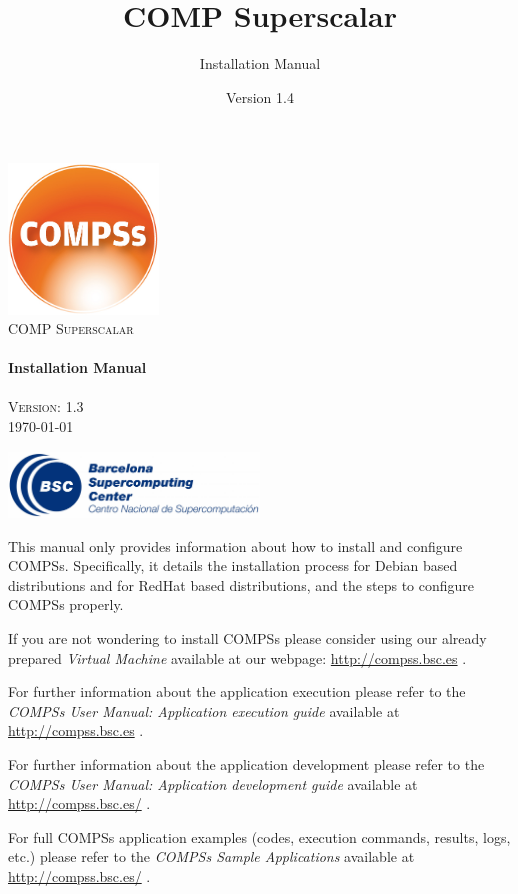 \documentclass[a4paper,12pt]{article}
\title{COMP Superscalar}
\author{Installation Manual}
\date{Version 1.4}
\begin{document}
  \hypersetup{pageanchor=false}
  \begin{titlepage} 
    \begin{center} 
      \includegraphics[width=0.3\textwidth]{./Figures/Logos/degradado-naranja-compss.jpg}~\\[1cm] 
      \textsc{\LARGE COMP Superscalar}\\[1.5cm] 
      
      \HRule \\[0.4cm] 
      { \huge \bfseries Installation Manual \\[0.4cm] }
      \HRule \\[1.5cm] 

      { \large \textsc{Version: 1.3 }} \\[0.3cm]
      { \large \today } 
      
      \vfill 
      \includegraphics[width=0.5\textwidth]{./Figures/bsc_280.jpg}~\\[1cm]
    \end{center} 
  \end{titlepage}
  \hypersetup{pageanchor=true}
  
  {
    This manual only provides information about how to install and configure COMPSs. Specifically, it details the installation 
    process for Debian based distributions and for RedHat based distributions, and the steps to configure COMPSs properly.
    \newline
    
    If you are not wondering to install COMPSs please consider using our already prepared \textit{Virtual Machine} available
    at our webpage: \url{http://compss.bsc.es} .
    \newline
    
    For further information about the application execution please refer to the \textit{COMPSs User Manual: Application execution
    guide} available at \url{http://compss.bsc.es} .
    
    For further information about the application development please refer to the \textit{COMPSs User Manual: Application development
    guide} available at \url{http://compss.bsc.es/} .
    
    For full COMPSs application examples (codes, execution commands, results, logs, etc.) please refer to the \textit{COMPSs Sample 
    Applications} available at \url{http://compss.bsc.es/} .
  }
  
\end{document}
